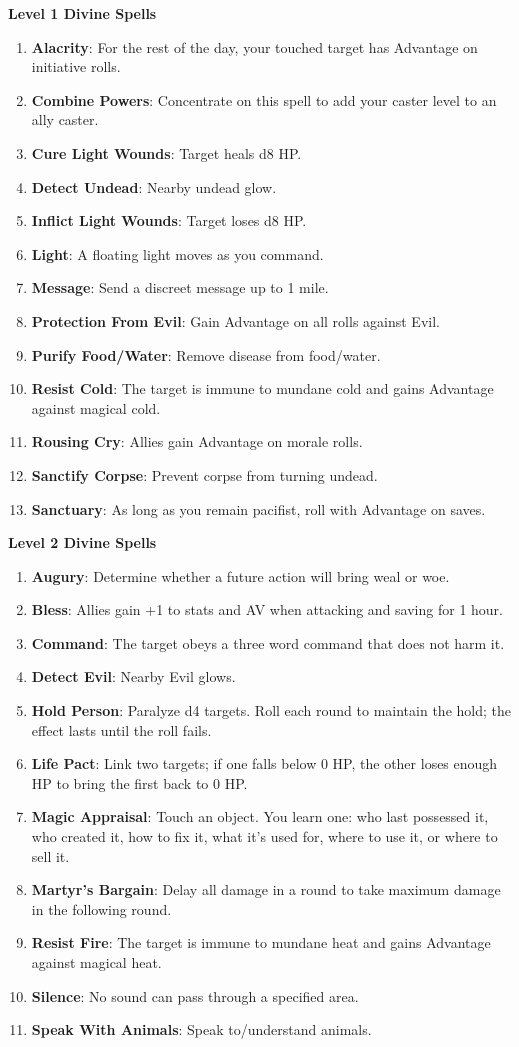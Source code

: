 \documentclass[twoside]{article}
\begin{document}
\textbf{Level 1 Divine Spells}
\begin{enumerate}[nosep]
\item \textbf{Alacrity}: For the rest of the day, your touched target has Advantage on initiative rolls.
\item \textbf{Combine Powers}: Concentrate on this spell to add your caster level to an ally caster.
\item \textbf{Cure Light Wounds}: Target heals d8 HP.
\item \textbf{Detect Undead}: Nearby undead glow.
\item \textbf{Inflict Light Wounds}: Target loses d8 HP.
\item \textbf{Light}: A floating light moves as you command.
\item \textbf{Message}: Send a discreet message up to 1 mile.
\item \textbf{Protection From Evil}: Gain Advantage on all rolls against Evil.
\item \textbf{Purify Food/Water}: Remove disease from food/water.
\item \textbf{Resist Cold}: The target is immune to mundane cold and gains Advantage against magical cold.
\item \textbf{Rousing Cry}: Allies gain Advantage on morale rolls.
\item \textbf{Sanctify Corpse}: Prevent corpse from turning undead.
\item \textbf{Sanctuary}: As long as you remain pacifist, roll with Advantage on saves.
\end{enumerate}

\textbf{Level 2 Divine Spells}
\begin{enumerate}[nosep]
\item \textbf{Augury}: Determine whether a future action will bring weal or woe.
\item \textbf{Bless}: Allies gain +1 to stats and AV when attacking and saving for 1 hour.
\item \textbf{Command}: The target obeys a three word command that does not harm it.
\item \textbf{Detect Evil}: Nearby Evil glows.
\item \textbf{Hold Person}: Paralyze d4 targets. Roll each round to maintain the hold; the effect lasts until the roll fails.
\item \textbf{Life Pact}: Link two targets; if one falls below 0 HP, the other loses enough HP to bring the first back to 0 HP.
\item \textbf{Magic Appraisal}: Touch an object. You learn one: who last possessed it, who created it, how to fix it, what it's used for, where to use it, or where to sell it.
\item \textbf{Martyr's Bargain}: Delay all damage in a round to take maximum damage in the following round.
\item \textbf{Resist Fire}: The target is immune to mundane heat and gains Advantage against magical heat.
\item \textbf{Silence}: No sound can pass through a specified area.
\item \textbf{Speak With Animals}: Speak to/understand animals.
\end{enumerate}
\end{document}
